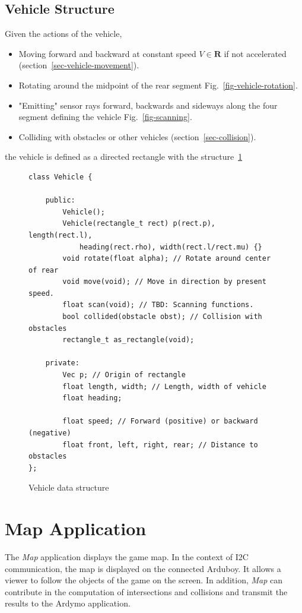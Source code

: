 \documentclass[11pt]{article}
\newcommand{\Rb}{\mathbf{R}}
\newcommand{\figref}[1]{Fig.~\eqref{#1}}
\newcommand{\Map}{\textsl{Map}}
\begin{document}
\subsection{Vehicle Structure}
\label{sec-game-vehicle-structure}

Given the actions of the vehicle,
\begin{itemize}
    \item Moving forward and backward at constant speed $V\in\Rb$ if not accelerated
        (section~\ref{sec-vehicle-movement}).
    \item Rotating around the midpoint of the rear segment
        \figref{fig-vehicle-rotation}.
    \item "Emitting" sensor rays forward, backwards and sideways along the
        four segment defining the vehicle \figref{fig-scanning}.
    \item Colliding with obstacles or other vehicles
        (section~\ref{sec-collision}).
\end{itemize}
the vehicle is defined as a directed rectangle with the
structure~\ref{code-vehicle-data-structure}
\begin{figure}
\begin{verbatim}
class Vehicle {

    public:
        Vehicle();
        Vehicle(rectangle_t rect) p(rect.p), length(rect.l),
            heading(rect.rho), width(rect.l/rect.mu) {}
        void rotate(float alpha); // Rotate around center of rear
        void move(void); // Move in direction by present speed.
        float scan(void); // TBD: Scanning functions. 
        bool collided(obstacle obst); // Collision with obstacles
        rectangle_t as_rectangle(void);

    private:
        Vec p; // Origin of rectangle
        float length, width; // Length, width of vehicle
        float heading;

        float speed; // Forward (positive) or backward (negative)
        float front, left, right, rear; // Distance to obstacles
};
\end{verbatim}
\caption{Vehicle data structure}\label{code-vehicle-data-structure}
\end{figure}

\section{Map Application}
\label{sec-map-application}

The \Map{} application displays the game map. In the context of I2C
communication, the map is displayed on the connected Arduboy. It allows a
viewer to follow the objects of the game on the screen. In addition, \Map{}
can contribute in the computation of intersections and collisions and transmit
the results to the Ardymo application.
\end{document}
